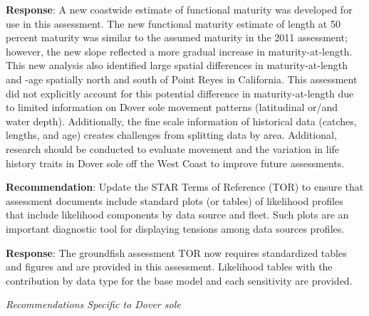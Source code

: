 \documentclass[11pt,
  english,
  a4paper,
]{article}
\begin{document}
\leavevmode\tagmcend\tagstructend\par


\textbf{Response}: A new coastwide estimate of functional maturity was developed for use in this assessment. The new functional maturity estimate of length at 50 percent maturity was similar to the assumed maturity in the 2011 assessment; however, the new slope reflected a more gradual increase in maturity-at-length. This new analysis also identified large spatial differences in maturity-at-length and -age spatially north and south of Point Reyes in California. This assessment did not explicitly account for this potential difference in maturity-at-length due to limited information on Dover sole movement patterns (latitudinal or/and water depth). Additionally, the fine scale information of historical data (catches, lengths, and age) creates challenges from splitting data by area. Additional, research should be conducted to evaluate movement and the variation in life history traits in Dover sole off the West Coast to improve future assessments.

\leavevmode\tagmcend\tagstructend\par


\textbf{Recommendation}: Update the STAR Terms of Reference (TOR) to ensure that assessment documents include standard plots (or tables) of likelihood profiles that include likelihood components by data source and fleet. Such plots are an important diagnostic tool for displaying tensions among data sources profiles.

\leavevmode\tagmcend\tagstructend\par


\textbf{Response}: The groundfish assessment TOR now requires standardized tables and figures and are provided in this assessment. Likelihood tables with the contribution by data type for the base model and each sensitivity are provided.

\leavevmode\tagmcend\tagstructend\par


\emph{Recommendations Specific to Dover sole}

\leavevmode\tagmcend\tagstructend\par
\end{document}
